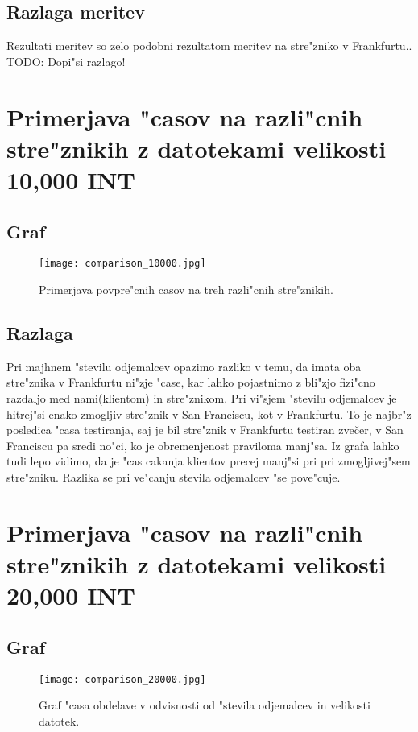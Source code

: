 \subsection{Razlaga meritev}
Rezultati meritev so zelo podobni rezultatom meritev na stre"zniko v Frankfurtu..
TODO: Dopi"si razlago!

\section{Primerjava "casov na razli"cnih stre"znikih z datotekami velikosti 10,000 INT}

\subsection{Graf}
\begin{figure}
  \centering
    \texttt{[image: comparison\_10000.jpg]}
  \caption{Primerjava povpre"cnih casov na treh razli"cnih stre"znikih.}
  \label{8_graph_comparison_10000}
\end{figure}

\subsection{Razlaga}
Pri majhnem "stevilu odjemalcev opazimo razliko v temu, da imata oba stre"znika v Frankfurtu ni"zje "case, kar lahko pojastnimo z bli"zjo fizi"cno razdaljo med nami(klientom) in stre"znikom. 
Pri vi"sjem "stevilu odjemalcev je hitrej"si enako zmogljiv stre"znik v San Franciscu, kot v Frankfurtu. To je najbr"z posledica "casa testiranja, saj je bil stre"znik v Frankfurtu testiran zvečer, v San Franciscu pa sredi no"ci, ko je obremenjenost praviloma manj"sa.
Iz grafa lahko tudi lepo vidimo, da je "cas cakanja klientov precej manj"si pri pri zmogljivej"sem stre"zniku. Razlika se pri ve"canju stevila odjemalcev "se pove"cuje.

\section{Primerjava "casov na razli"cnih stre"znikih z datotekami velikosti 20,000 INT}

\subsection{Graf}
\begin{figure}
  \centering
    \texttt{[image: comparison\_20000.jpg]}
  \caption{Graf "casa obdelave v odvisnosti od "stevila odjemalcev in velikosti datotek.}
  \label{8_graph_comparison_20000}
\end{figure}

